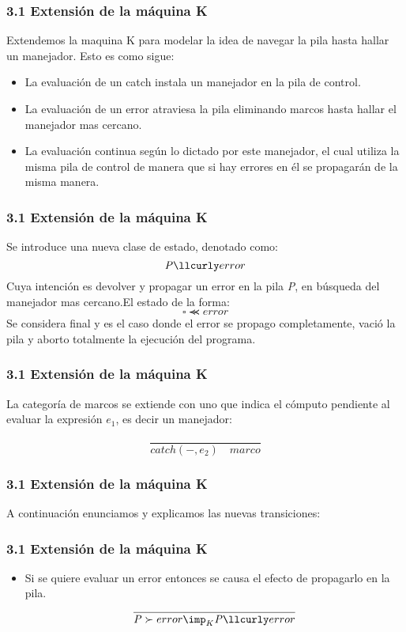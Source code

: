 \documentclass[xcolor=dvipsnames,table,spanish]{beamer}
\begin{document}
\begin{frame}
\frametitle{3.1 Extensión de la máquina K}
Extendemos la maquina K para modelar la idea de navegar la pila hasta hallar un manejador. Esto es como sigue:
\begin{itemize}
		\item La evaluación de un catch instala un manejador en la pila de control.
		\item La evaluación de un error atraviesa la pila eliminando marcos hasta hallar el manejador mas cercano.
		\item La evaluación continua según lo dictado por este manejador, el cual utiliza la misma pila de control de manera que si hay errores en él se propagarán de la misma manera.
\end{itemize}

\end{frame}

\begin{frame}
\frametitle{3.1 Extensión de la máquina K}
Se introduce una nueva clase de estado, denotado como: \[\textrm{\textit{P}} \llcurly error\] Cuya intención es devolver y propagar un error en la pila \textrm{\textit{P}}, en búsqueda del manejador mas cercano.\newline El estado de la forma: \[ \square \llcurly error \] Se considera final y es el caso donde el error se propago completamente, vació la pila y aborto totalmente la ejecución del programa.
\end{frame}

\begin{frame}
\frametitle{3.1 Extensión de la máquina K}
La categoría de marcos se extiende con uno que indica el cómputo pendiente al evaluar la expresión $e_1$, es decir un manejador:

\[\frac{}{catch(-,e_2) \quad marco}\]

\end{frame}

\begin{frame}
\frametitle{3.1 Extensión de la máquina K}
A continuación enunciamos y explicamos las nuevas transiciones:
\end{frame}

\begin{frame}
\frametitle{3.1 Extensión de la máquina K}
\begin{itemize}
		\item Si se quiere evaluar un error entonces se causa el efecto de propagarlo en la pila.
        \[ \frac{}{\textrm{\textit{P}} \succ error \imp _K  \textrm{\textit{P}} \llcurly error}\]
\end{itemize}
\end{frame}
\end{document}
